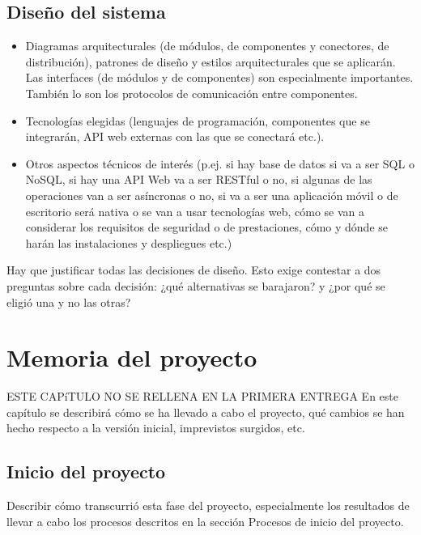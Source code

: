 \documentclass[12pt]{article}%
\begin{document}
\subsection{Diseño del sistema}
\begin{itemize}
	\item Diagramas arquitecturales (de m\'odulos, de componentes y conectores, de distribuci\'on), patrones de diseño y estilos arquitecturales que se aplicar\'an. Las interfaces (de m\'odulos y de componentes) son especialmente importantes. Tambi\'en lo son los protocolos de comunicaci\'on entre componentes.
	\item Tecnolog\'ias elegidas (lenguajes de programaci\'on, componentes que se integrar\'an, API web externas con las que se conectar\'a etc.).
	\item Otros aspectos t\'ecnicos de inter\'es (p.ej. si hay base de datos si va a ser SQL o NoSQL, si hay una API Web va a ser RESTful o no, si algunas de las operaciones van a ser as\'incronas o no, si va a ser una aplicaci\'on m\'ovil o de escritorio ser\'a nativa o se van a usar tecnolog\'ias web, c\'omo se van a considerar los requisitos de seguridad o de prestaciones, c\'omo y d\'onde se har\'an las instalaciones y despliegues etc.)
\end{itemize}

Hay que justificar todas las decisiones de diseño. Esto exige contestar a dos preguntas sobre cada decisi\'on: ¿qu\'e alternativas se barajaron? y ¿por qu\'e se eligi\'o una y no las otras?



\section{Memoria del proyecto} %

\label{Chapter5} %


ESTE CAP\'iTULO NO SE RELLENA EN LA PRIMERA ENTREGA
En este cap\'itulo se describir\'a c\'omo se ha llevado a cabo el proyecto, qu\'e cambios se han hecho respecto a la versi\'on inicial, imprevistos surgidos, etc.
\subsection{Inicio del proyecto}
Describir c\'omo transcurri\'o esta fase del proyecto, especialmente los resultados de llevar a cabo los procesos descritos en la secci\'on Procesos de inicio del proyecto.
\end{document}
